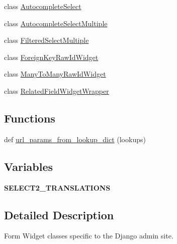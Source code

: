 \begin{DoxyCompactItemize}
\item 
class \mbox{\hyperlink{classdjango_1_1contrib_1_1admin_1_1widgets_1_1_autocomplete_select}{Autocomplete\+Select}}
\item 
class \mbox{\hyperlink{classdjango_1_1contrib_1_1admin_1_1widgets_1_1_autocomplete_select_multiple}{Autocomplete\+Select\+Multiple}}
\item 
class \mbox{\hyperlink{classdjango_1_1contrib_1_1admin_1_1widgets_1_1_filtered_select_multiple}{Filtered\+Select\+Multiple}}
\item 
class \mbox{\hyperlink{classdjango_1_1contrib_1_1admin_1_1widgets_1_1_foreign_key_raw_id_widget}{Foreign\+Key\+Raw\+Id\+Widget}}
\item 
class \mbox{\hyperlink{classdjango_1_1contrib_1_1admin_1_1widgets_1_1_many_to_many_raw_id_widget}{Many\+To\+Many\+Raw\+Id\+Widget}}
\item 
class \mbox{\hyperlink{classdjango_1_1contrib_1_1admin_1_1widgets_1_1_related_field_widget_wrapper}{Related\+Field\+Widget\+Wrapper}}
\end{DoxyCompactItemize}
\subsection*{Functions}
\begin{DoxyCompactItemize}
\item 
def \mbox{\hyperlink{namespacedjango_1_1contrib_1_1admin_1_1widgets_aa99daa950f5ab57637ccca6d1dfe0b9c}{url\+\_\+params\+\_\+from\+\_\+lookup\+\_\+dict}} (lookups)
\end{DoxyCompactItemize}
\subsection*{Variables}
\begin{DoxyCompactItemize}
\item 
\mbox{\label{namespacedjango_1_1contrib_1_1admin_1_1widgets_ad38f47a80e2d63894810a310369dca96}} 
{\bfseries S\+E\+L\+E\+C\+T2\+\_\+\+T\+R\+A\+N\+S\+L\+A\+T\+I\+O\+NS}
\end{DoxyCompactItemize}


\subsection{Detailed Description}
\begin{DoxyVerb}Form Widget classes specific to the Django admin site.
\end{DoxyVerb}
 

